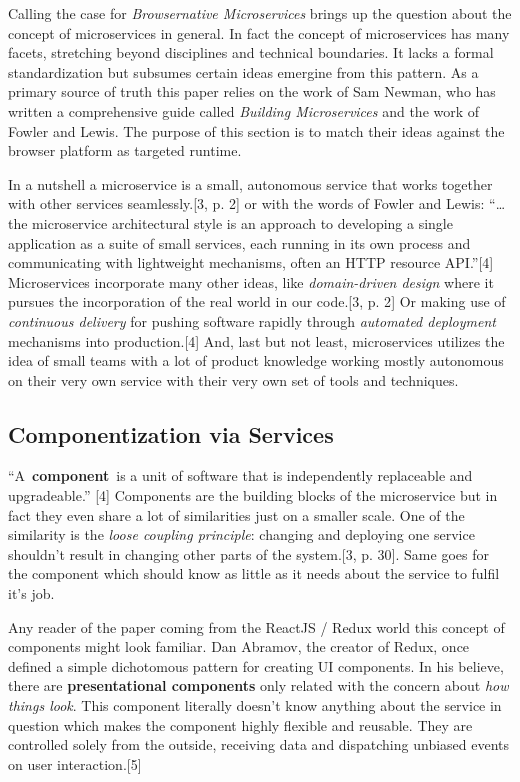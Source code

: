 \documentclass[]{assets/latex/ieee}
\begin{document}
Calling the case for \emph{Browsernative Microservices} brings up the
question about the concept of microservices in general. In fact the
concept of microservices has many facets, stretching beyond disciplines
and technical boundaries. It lacks a formal standardization but subsumes
certain ideas emergine from this pattern. As a primary source of truth
this paper relies on the work of Sam Newman, who has written a
comprehensive guide called \emph{Building Microservices} and the work of
Fowler and Lewis. The purpose of this section is to match their ideas
against the browser platform as targeted runtime.

In a nutshell a microservice is a small, autonomous service that works
together with other services seamlessly.{[}3, p. 2{]} or with the words
of Fowler and Lewis: ``\ldots{} the microservice architectural style is
an approach to developing a single application as a suite of small
services, each running in its own process and communicating with
lightweight mechanisms, often an HTTP resource API.''{[}4{]}
Microservices incorporate many other ideas, like \emph{domain-driven
design} where it pursues the incorporation of the real world in our
code.{[}3, p. 2{]} Or making use of \emph{continuous delivery} for
pushing software rapidly through \emph{automated deployment} mechanisms
into production.{[}4{]} And, last but not least, microservices utilizes
the idea of small teams with a lot of product knowledge working mostly
autonomous on their very own service with their very own set of tools
and techniques.

\subsection{Componentization via
Services}\label{componentization-via-services}

``A~\textbf{component}~is a unit of software that is independently
replaceable and upgradeable.'' {[}4{]} Components are the building
blocks of the microservice but in fact they even share a lot of
similarities just on a smaller scale. One of the similarity is the
\emph{loose coupling principle}: changing and deploying one service
shouldn't result in changing other parts of the system.{[}3, p. 30{]}.
Same goes for the component which should know as little as it needs
about the service to fulfil it's job.

Any reader of the paper coming from the ReactJS / Redux world this
concept of components might look familiar. Dan Abramov, the creator of
Redux, once defined a simple dichotomous pattern for creating UI
components. In his believe, there are \textbf{presentational components}
only related with the concern about \emph{how things look}. This
component literally doesn't know anything about the service in question
which makes the component highly flexible and reusable. They are
controlled solely from the outside, receiving data and dispatching
unbiased events on user interaction.{[}5{]}
\end{document}
